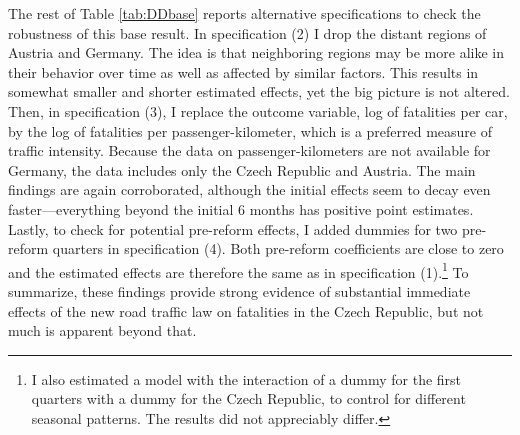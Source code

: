 \documentclass[12pt]{article}
\begin{document}
\begin{table}[t] 
  \footnotesize  
\end{table}

The rest of Table \ref{tab:DDbase} reports alternative specifications to check
the robustness of this base result. In specification (2) I drop the distant
regions of Austria and Germany. The idea is that neighboring regions may be more
alike in their behavior over time as well as affected by similar factors. This
results in somewhat smaller and shorter estimated effects, yet the big picture
is not altered. Then, in specification (3), I replace the outcome variable, log
of fatalities per car, by the log of fatalities per passenger-kilometer, which
is a preferred measure of traffic intensity. Because the data on
passenger-kilometers are not available for Germany, the data includes only the
Czech Republic and Austria. The main findings  are again corroborated, although
the initial effects seem to decay even faster---everything beyond the initial 6
months has positive point estimates. Lastly, to check for potential pre-reform
effects, I added dummies for two pre-reform quarters in specification (4).  Both
pre-reform coefficients are close to zero and the estimated effects are
therefore the same as in specification (1).\footnote{I also estimated a model
  with the interaction of a dummy for the first quarters with a dummy for the
  Czech Republic, to control for different seasonal patterns. The results did
  not appreciably differ.} To summarize, these findings provide strong evidence
of substantial immediate effects of the new road traffic law on fatalities in
the Czech Republic, but not much is apparent beyond that.
\end{document}
